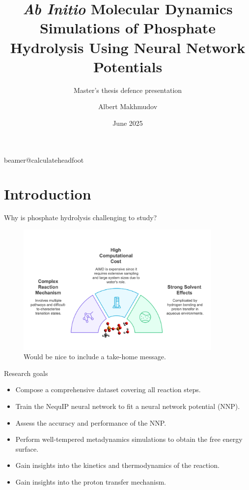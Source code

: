 \documentclass[11pt,t]{beamer}
\title[`AIMD' Simulations of Phosphate Hydrolysis Using NNPs]{\textit{Ab Initio} Molecular Dynamics Simulations of Phosphate Hydrolysis Using Neural Network Potentials} %
\subtitle{Master's thesis defence presentation}
\author{Albert Makhmudov}
\institute{Supervisor: Prof. J. Harvey}
\date{June 2025}
\begin{document}
\csname beamer@calculateheadfoot\endcsname %



\begin{frame}
	\titlepage
\end{frame}



\section{Introduction}
\begin{frame}{Why is phosphate hydrolysis challenging to study?}
	\vspace{-30pt}
	\begin{figure}
		\centering
		\includegraphics[width=0.9\textwidth]{Figures/introduction_background.png}
		\small
		\flushleft
		Would be nice to include a take-home message.
	\end{figure}
\end{frame}



\begin{frame}{Research goals}
	\small
	\begin{itemize}
		\item Compose a comprehensive dataset covering all reaction steps.
		\item Train the NequIP neural network to fit a neural network potential (NNP).
		\item Assess the accuracy and performance of the NNP.
		\item Perform well-tempered metadynamics simulations to obtain the free energy surface.
		\item Gain insights into the kinetics and thermodynamics of the reaction.
		\item Gain insights into the proton transfer mechanism.
	\end{itemize}	
\end{frame}
\end{document}
